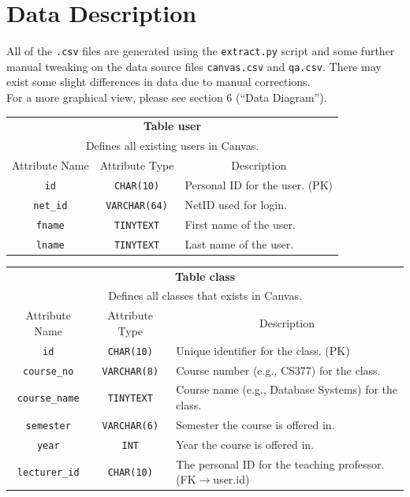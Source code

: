 \documentclass{paper}
\begin{document}
	\section{Data Description}
	All of the \verb|.csv| files are generated using the \verb|extract.py| script and some further manual tweaking on the data source files \verb|canvas.csv| and \verb|qa.csv|. There may exist some slight differences in data due to manual corrections.\\
	For a more graphical view, please see section 6 (``Data Diagram'').
	\begin{center}
		\begin{tabular}{c | c | l}
			\toprule
			\multicolumn{3}{c}{\textbf{Table user}} \\
			\multicolumn{3}{c}{Defines all existing users in Canvas.}\\
			\midrule
			Attribute Name & Attribute Type & \multicolumn{1}{c}{Description} \\
			\verb|id| & \verb|CHAR(10)| & Personal ID for the user. (PK)\\
			\verb|net_id| & \verb|VARCHAR(64)| & NetID used for login. \\
			\verb|fname| & \verb|TINYTEXT| & First name of the user. \\
			\verb|lname| & \verb|TINYTEXT| & Last name of the user. \\
			\bottomrule
		\end{tabular}\vspace{1.5em}
	
		\begin{tabular}{c | c | l}
			\toprule
			\multicolumn{3}{c}{\textbf{Table class}} \\
			\multicolumn{3}{c}{Defines all classes that exists in Canvas.}\\
			\midrule
			Attribute Name & Attribute Type & \multicolumn{1}{c}{Description} \\
			\verb|id| & \verb|CHAR(10)| & Unique identifier for the class. (PK)\\
			\verb|course_no| & \verb|VARCHAR(8)| & Course number (e.g., CS377) for the class.\\
			\verb|course_name| & \verb|TINYTEXT| & Course name (e.g., Database Systems) for the class.\\
			\verb|semester| & \verb|VARCHAR(6)| & Semester the course is offered in.\\
			\verb|year| & \verb|INT| & Year the course is offered in.\\
			\verb|lecturer_id| & \verb|CHAR(10)| & The personal ID for the teaching professor. (FK$\to$user.id)\\
			\bottomrule
		\end{tabular}\vspace{1.5em}


\end{center}
\end{document}
